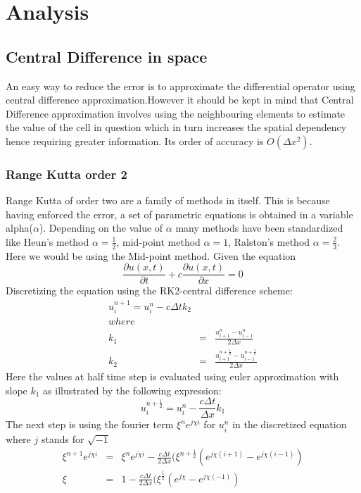 \documentclass[a4paper,12pt]{report}
\begin{document}
\chapter{Analysis}
\section{Central Difference in space}
An easy way to reduce the error is to approximate the differential operator using central difference approximation.However it should be kept in mind that Central Difference approximation involves using the neighbouring elements to estimate the value of the cell in question which in turn increases the spatial dependency hence requiring greater information. Its order of accuracy is $O(\Delta x^2)$.
\subsection{Range Kutta order 2}
Range Kutta of order two are a family of methods in itself. This is because having enforced the error, a set of parametric equations is obtained in a variable alpha($\alpha$). Depending on the value of $\alpha$ many methods have been standardized like Heun's method $\alpha=\frac{1}{2}$, mid-point method $\alpha=1$, Ralston's method $\alpha=\frac{2}{3}$. Here we would be using the Mid-point method.
Given the equation
\[\frac{\partial u(x,t)}{\partial t}+c\frac{\partial u(x,t)}{\partial x} = 0 \]
Discretizing the equation using the RK2-central difference scheme:
\begin{eqnarray}
u^{n+1}_{i} = u^{n}_{i} - c\Delta t k_2 \label{ctdeqn}\\ 
where \nonumber \\
k_1 &=& \frac{u_{i+1}^{n} -u_{i-1}^{n}}{2\Delta x} \nonumber \\
k_2 &=& \frac{u_{i+1}^{n+\frac{1}{2}} -u_{i-1}^{n+\frac{1}{2}}}{2\Delta x} \nonumber
\end{eqnarray}
Here the values at half time step is evaluated using euler approximation with slope $k_1$ as illustrated by the following expression:
\[u_{i}^{n+\frac{1}{2}} = u_{i}^{n} - \frac{c\Delta t}{\Delta x}k_1 \]
The next step is using the fourier term $\xi^{n}e^{j\chi i}$ for $u^{n}_{i}$ in the discretized equation where $j$ stands for $\sqrt{-1}$
\begin{eqnarray}
\xi^{n+1}e^{j\chi i} &=& \xi^{n}e^{j\chi i} -\frac{c\Delta t}{2\Delta x}(\xi^{n+\frac{1}{2}}(e^{j\chi(i+1)}-e^{j\chi(i-1)}) \label{eqn}\\
\xi&=& 1 -\frac{c\Delta t}{2\Delta x}(\xi^{\frac{1}{2}}(e^{j\chi}-e^{j\chi(-1)}) \nonumber
\end{eqnarray}
\end{document}
